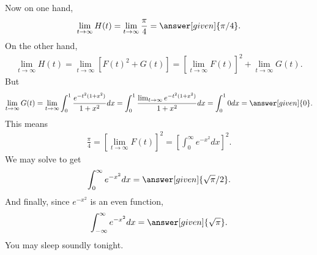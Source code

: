 \documentclass{ximera}
\begin{document}
\begin{exercise}
\begin{exercise}
\begin{exercise}
			Now on one hand,
			\begin{align*}
				\lim_{t \to \infty} H(t) = \lim_{t \to \infty} \frac{\pi}{4} = \answer[given]{\pi/4}.
			\end{align*}
			On the other hand,
			\begin{align*}
				\lim_{t \to \infty} H(t) = \lim_{t \to \infty} \left[ F(t)^2+G(t) \right] = \left[\lim_{t \to \infty} F(t) \right]^2 + \lim_{t \to \infty} G(t).
			\end{align*}
			But
			\begin{align*}
				\lim_{t \to \infty} G(t) = \lim_{t \to \infty} \int_{0}^{1} \frac{e^{-t^2(1+x^2)}}{1+x^2} dx = \int_{0}^{1} \frac{ \lim_{t \to \infty} e^{-t^2(1+x^2)}}{1+x^2} dx = \int_{0}^{1} 0 dx = \answer[given]{0}.
			\end{align*}
			This means
			\begin{align*}
				\frac{\pi}{4} = \left[\lim_{t \to \infty} F(t) \right]^2 = \left[ \int_{0}^{\infty} e^{-x^2} dx \right]^2.
			\end{align*}
			We may solve to get
			\begin{align*}
				\int_{0}^{\infty} e^{-x^2} dx = \answer[given]{\sqrt{\pi}/2}.
			\end{align*}			
			And finally, since $e^{-x^2}$ is an even function,
			\begin{align*}
				\int_{-\infty}^{\infty} e^{-x^2} dx = \answer[given]{\sqrt{\pi}}.
			\end{align*}
			You may sleep soundly tonight.
			
			
		\end{exercise}
		
	
	\end{exercise}


\end{exercise}
\end{document}
